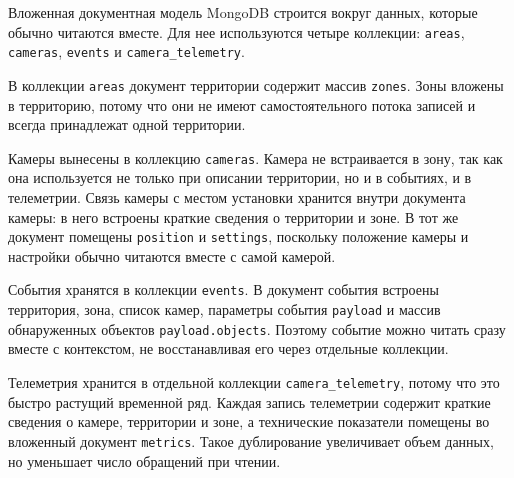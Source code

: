 Вложенная документная модель MongoDB строится вокруг данных, которые обычно
читаются вместе. Для нее используются четыре коллекции: \texttt{areas},
\texttt{cameras}, \texttt{events} и \texttt{camera\_telemetry}.

В коллекции \texttt{areas} документ территории содержит массив
\texttt{zones}. Зоны вложены в территорию, потому что они не имеют
самостоятельного потока записей и всегда принадлежат одной территории.

Камеры вынесены в коллекцию \texttt{cameras}. Камера не встраивается в зону,
так как она используется не только при описании территории, но и в событиях,
и в телеметрии. Связь камеры с местом установки хранится внутри документа
камеры: в него встроены краткие сведения о территории и зоне. В тот же
документ помещены \texttt{position} и \texttt{settings}, поскольку положение
камеры и настройки обычно читаются вместе с самой камерой.

События хранятся в коллекции \texttt{events}. В документ события встроены
территория, зона, список камер, параметры события \texttt{payload} и массив
обнаруженных объектов \texttt{payload.objects}. Поэтому событие можно читать
сразу вместе с контекстом, не восстанавливая его через отдельные коллекции.

Телеметрия хранится в отдельной коллекции \texttt{camera\_telemetry}, потому
что это быстро растущий временной ряд. Каждая запись телеметрии содержит
краткие сведения о камере, территории и зоне, а технические показатели
помещены во вложенный документ \texttt{metrics}. Такое дублирование увеличивает
объем данных, но уменьшает число обращений при чтении.

\newpage
